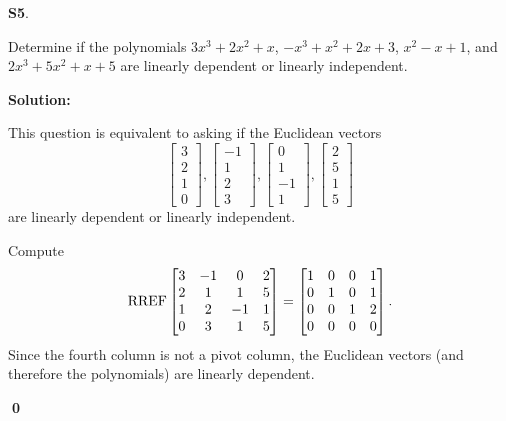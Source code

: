 \documentclass{article}
\newenvironment{problem}[1]
{
  \begin{flushleft}
  \textbf{#1}.
  \ignorespaces
}
{
  \end{flushleft}
}
\newenvironment{solution}
{
  \ignorespaces
  \textbf{Solution:}
}
{
  \ignorespacesafterend
  \begin{flushright}
  {\bfseries \qed}
  \end{flushright}
}
\begin{document}
\begin{problem}{S5}
Determine if the polynomials \(3x^3+2x^2+x\), \(-x^3+x^2+2x+3\), \(x^2-x+1\), and \(2x^3+5x^2+x+5\)
are linearly dependent or linearly independent.
\end{problem}
\begin{solution}
This question is equivalent to asking if the Euclidean vectors
\[
  \begin{bmatrix} 3\\2\\1\\0\end{bmatrix},
  \begin{bmatrix} -1\\1\\2\\3\end{bmatrix},
  \begin{bmatrix} 0\\1\\-1\\1\end{bmatrix},
  \begin{bmatrix} 2\\5\\1\\5\end{bmatrix}
\]
are linearly dependent or linearly independent.

Compute
\[\operatorname{RREF} \begin{bmatrix} 3 & -1 & 0 & 2 \\ 2 & 1 & 1 & 5 \\ 1 & 2 & -1 & 1 \\ 0 & 3 & 1 & 5 \end{bmatrix} =
\begin{bmatrix} 1 & 0 & 0 & 1 \\ 0 & 1 & 0 & 1 \\ 0 & 0 & 1 & 2 \\ 0 & 0 & 0 & 0 \end{bmatrix}.\]
Since the fourth column is not a pivot column, the Euclidean vectors
(and therefore the polynomials) are linearly dependent.
\end{solution}
\end{document}
